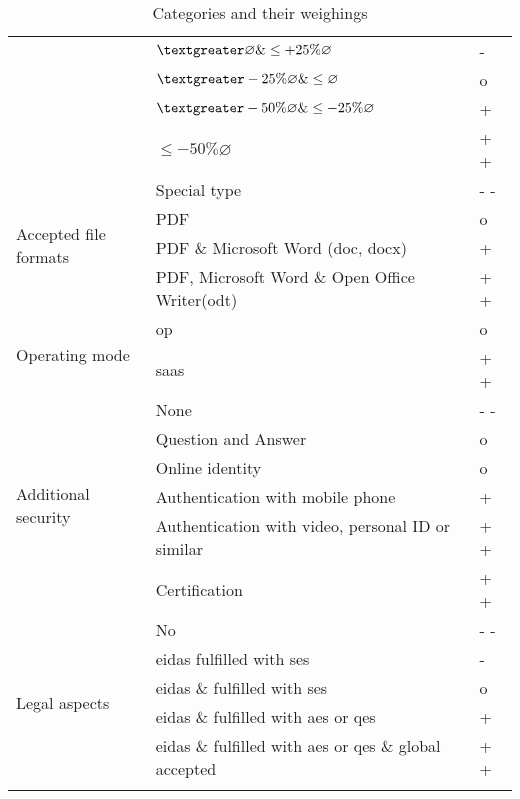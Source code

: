 \begin{longtable}{|p{4cm}|p{9cm}|p{1.5cm}|}
								& $ \textgreater \varnothing \& \leq +25\% \varnothing $ & - \\ \cline{2-3}
								& $ \textgreater -25\% \varnothing \& \leq \varnothing  $ & o \\ \cline{2-3}
								& $ \textgreater -50\% \varnothing \& \leq -25\% \varnothing $ & + \\ \cline{2-3}
								& $ \leq -50\% \varnothing $ & + + \\ \hline
		\multirow{4}{*}{Accepted file formats} & Special type & - - \\ \cline{2-3}
												& \Gls{PDF} & o \\ \cline{2-3}
												& \Gls{PDF} \& Microsoft Word (doc, docx) & + \\ \cline{2-3}
												& \Gls{PDF}, Microsoft Word \& Open Office Writer(odt) & + + \\ \hline
		\multirow{2}{*}{Operating mode} & \gls{op} & o \\ \cline{2-3}
										 & \gls{saas} & + + \\ \hline
		\multirow{6}{*}{Additional security} & None & - - \\ \cline{2-3}
											& Question and Answer & o \\ \cline{2-3} 
											& Online identity & o \\ \cline{2-3}
											& Authentication with mobile phone & + \\ \cline{2-3}
											& Authentication with video, personal ID or similar & + + \\ \cline{2-3}
											& Certification & + + \\ \hline
		\multirow{6}{*}{Legal aspects} & No & - - \\ \cline{2-3}
										& \gls{eidas} fulfilled with \gls{ses} & - \\ \cline{2-3}
										& \gls{eidas} \& \glossary{gdpr} fulfilled with \gls{ses} & o \\ \cline{2-3}
										& \gls{eidas} \& \glossary{gdpr} fulfilled with \gls{aes} or \gls{qes} & + \\ \cline{2-3}
										& \gls{eidas} \& \glossary{gdpr} fulfilled with \gls{aes} or \gls{qes} \& global accepted & + + \\ \hline
	\caption{Categories and their weighings}
	\label{tool:tab:resTcateg}
	\end{longtable}
